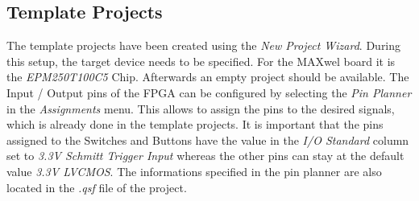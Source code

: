 \subsection{Template Projects}

The template projects have been created using the \textit{New Project Wizard}. During this setup, the target device needs to be specified. For the MAXwel board it is the \textit{EPM250T100C5} Chip. Afterwards an empty project should be available. The Input / Output pins of the FPGA can be configured by selecting the \textit{Pin Planner} in the \textit{Assignments} menu. This allows to assign the pins to the desired signals, which is already done in the template projects. It is important that the pins assigned to the Switches and Buttons have the value in the \textit{I/O Standard} column set to \textit{3.3V Schmitt Trigger Input} whereas the other pins can stay at the default value \textit{3.3V LVCMOS}. The informations specified in the pin planner are also located in the \textit{.qsf} file of the project.
